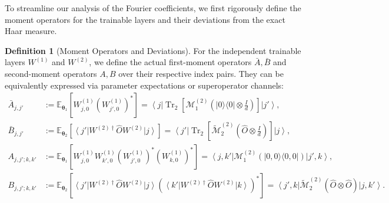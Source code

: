 \documentclass[%
 reprint,
 amsmath,amssymb,
 aps,
 pra,
]{revtex4-2}
\theoremstyle{definition}
\newtheorem{definition}[theorem]{Definition}
\begin{document}
To streamline our analysis of the Fourier coefficients, we first rigorously define the moment operators for the trainable layers and their deviations from the exact Haar measure.

\begin{definition}[Moment Operators and Deviations]
\label{def:moment_operators}
For the independent trainable layers $W^{(1)}$ and $W^{(2)}$, we define the actual first-moment operators $\bar A, \bar B$ and second-moment operators $A, B$ over their respective index pairs. They can be equivalently expressed via parameter expectations or superoperator channels:
\begin{align}
\bar A_{j,j'}
&:=
\mathbb{E}_{\bm{\theta}_1} \left[ W^{(1)}_{j,0} \left(W^{(1)}_{j',0}\right)^* \right]
=
\left\langle j\right| \operatorname{Tr}_2 \left[ \mathcal{M}^{(2)}_1 \left( |0\rangle\langle0|\otimes\frac{I}{d} \right) \right] \left|j'\right\rangle, \\
\bar B_{j,j'}
&:=
\mathbb{E}_{\bm{\theta}_2} \left[ \left\langle j'\right| W^{(2)\dagger}\hat O W^{(2)} \left|j\right\rangle \right]
=
\left\langle j'\right| \operatorname{Tr}_2 \left[ \widetilde{\mathcal{M}}^{(2)}_2 \left( \hat O\otimes\frac{I}{d} \right) \right] \left|j\right\rangle, \\
A_{j,j';k,k'}
&:=
\mathbb{E}_{\bm{\theta}_1} \left[ W^{(1)}_{j,0} W^{(1)}_{k',0} \left(W^{(1)}_{j',0}\right)^* \left(W^{(1)}_{k,0}\right)^* \right]
=
\left\langle j,k'\right| \mathcal{M}^{(2)}_1 \left( |0,0\rangle\langle0,0| \right) \left|j',k\right\rangle, \\
B_{j,j';k,k'}
&:=
\mathbb{E}_{\bm{\theta}_2} \left[ \left\langle j'\right| W^{(2)\dagger}\hat O W^{(2)} \left|j\right\rangle \left( \left\langle k'\right| W^{(2)\dagger}\hat O W^{(2)} \left|k\right\rangle \right)^* \right]
=
\left\langle j',k\right| \widetilde{\mathcal{M}}^{(2)}_2 \left( \hat O\otimes\hat O \right) \left|j,k'\right\rangle.
\end{align}


\end{definition}
\end{document}
